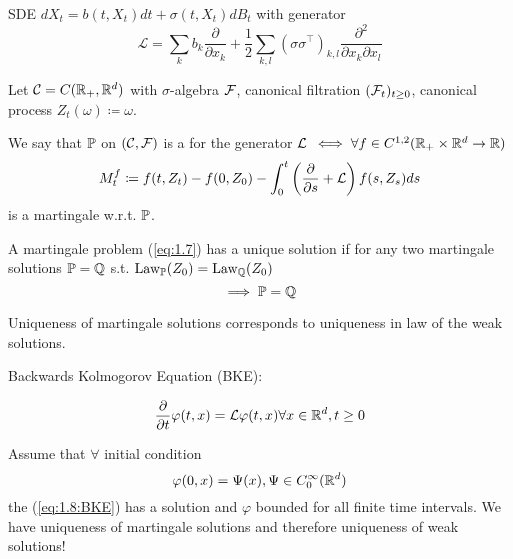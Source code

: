 SDE $dX_t=b(t,X_t)dt+\sigma(t,X_t)dB_t$ with generator 
\[\mathcal{L}=\sum_{k}b_k\frac{\partial}{\partial x_k}+\frac{1}{2}\sum_{k,l}(\sigma\sigma^\intercal)_{k,l}\frac{\partial^2}{\partial x_k\partial x_l}\]

\begin{definition}\label{def:1.24:martingale_solution}
    Let $\mathcal{C}=C(\mathbb{R}_+,\mathbb{R}^d)$ with $\sigma$-algebra $\mathcal{F}$,
    canonical filtration $(\mathcal{F}_t)_{t\geq 0}$, canonical process $Z_t(\omega)\coloneqq \omega$.

    We say that $\mathbb{P}$ on $(\mathcal{C},\mathcal{F})$ is a  for the generator $\mathcal{L}$ 
    $\iff \forall f\in C^{1,2}(\mathbb{R}_+\times \mathbb{R}^d\to\mathbb{R})$  
    \begin{equation}\label{eq:1.7}
        M_t^f\coloneqq f(t,Z_t)-f(0,Z_0)-\int_0^t\left( \frac{\partial}{\partial s}+\mathcal{L}\right)f(s,Z_s)ds 
    \end{equation}
    is a martingale w.r.t. $\mathbb{P}$.
\end{definition}

\begin{definition}\label{def:1.25}
    A martingale problem (\ref{eq:1.7}) has a unique solution if for any two 
    martingale solutions $\mathbb{P}=\mathbb{Q}$ s.t. $\text{Law}_{\mathbb{P}}(Z_0)=\text{Law}_{\mathbb{Q}}(Z_0)$
    \[\implies \mathbb{P}=\mathbb{Q}\]
\end{definition}

\begin{remark}
    Uniqueness of martingale solutions corresponds to uniqueness in law of the weak solutions.
\end{remark}

Backwards Kolmogorov Equation (BKE):

\begin{equation}\label{eq:1.8:BKE}
    \frac{\partial}{\partial t}\varphi(t,x)=\mathcal{L}\varphi(t,x)\forall x\in\mathbb{R}^d,t\geq 0
\end{equation}

\begin{theorem}\label{thm:1.26}
    Assume that $\forall$ initial condition 
    \[\varphi(0,x)=\Psi(x),\Psi\in C_0^\infty(\mathbb{R}^d)\]
    the (\ref{eq:1.8:BKE}) has a solution and $\varphi$ bounded for all finite time intervals. We have uniqueness of martingale solutions and therefore uniqueness of weak solutions!
\end{theorem}

